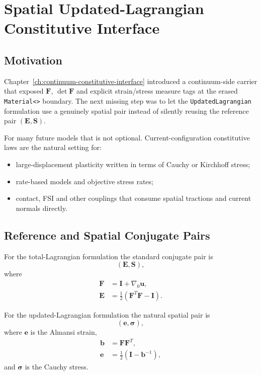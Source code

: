 \chapter{Spatial Updated-Lagrangian Constitutive Interface}
\label{ch:spatial-updated-lagrangian-interface}

\section{Motivation}

Chapter~\ref{ch:continuum-constitutive-interface} introduced a continuum-side
carrier that exposed $\mathbf{F}$, $\det\mathbf{F}$ and explicit strain/stress
measure tags at the erased \texttt{Material<>} boundary. The next missing step
was to let the \texttt{UpdatedLagrangian} formulation use a genuinely spatial
pair instead of silently reusing the reference pair
$(\mathbf{E}, \mathbf{S})$.

For many future models that is not optional. Current-configuration
constitutive laws are the natural setting for:
\begin{itemize}
  \item large-displacement plasticity written in terms of Cauchy or Kirchhoff
        stress;
  \item rate-based models and objective stress rates;
  \item contact, FSI and other couplings that consume spatial tractions and
        current normals directly.
\end{itemize}

\section{Reference and Spatial Conjugate Pairs}

For the total-Lagrangian formulation the standard conjugate pair is
\[
  (\mathbf{E}, \mathbf{S}),
\]
where
\begin{align}
  \mathbf{F} &= \mathbf{I} + \nabla_0 \mathbf{u}, \\
  \mathbf{E} &= \frac{1}{2}\left(\mathbf{F}^T \mathbf{F} - \mathbf{I}\right).
\end{align}

For the updated-Lagrangian formulation the natural spatial pair is
\[
  (\mathbf{e}, \boldsymbol{\sigma}),
\]
where $\mathbf{e}$ is the Almansi strain,
\begin{align}
  \mathbf{b} &= \mathbf{F}\mathbf{F}^T, \\
  \mathbf{e} &= \frac{1}{2}\left(\mathbf{I} - \mathbf{b}^{-1}\right),
\end{align}
and $\boldsymbol{\sigma}$ is the Cauchy stress.

